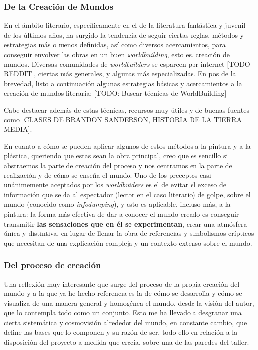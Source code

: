 \hypertarget{de-la-creaciuxf3n-de-mundos}{%
\subsubsection{De la Creación de
Mundos}\label{de-la-creaciuxf3n-de-mundos}}

En el ámbito literario, específicamente en el de la literatura
fantástica y juvenil de los últimos años, ha surgido la tendencia de
seguir ciertas reglas, métodos y estrategias más o menos definidas, así
como diversos acercamientos, para conseguir envolver las obras en un
buen \emph{worldbuilding}, esto es, creación de mundos. Diversas
comunidades de \emph{worldbuilders} se esparcen por internet {[}TODO
REDDIT{]}, ciertas más generales, y algunas más especializadas. En pos
de la brevedad, listo a continuación algunas estrategias básicas y
acercamientos a la creación de mundos literaria: {[}TODO: Buscar
técnicas de WorldBuilding{]}

Cabe destacar además de estas técnicas, recursos muy útiles y de buenas
fuentes como {[}CLASES DE BRANDON SANDERSON, HISTORIA DE LA TIERRA
MEDIA{]}.

En cuanto a cómo se pueden aplicar algunos de estos métodos a la pintura
y a la plástica, queriendo que estas sean la obra principal, creo que es
sencillo si abstraemos la parte de creación del proceso y nos centramos
en la parte de realización y de cómo se enseña el mundo. Uno de los
preceptos casi unánimemente aceptados por los \emph{worldbuiders} es el
de evitar el exceso de información que se da al espectador (lector en el
caso literario) de golpe, sobre el mundo (conocido como
\emph{infodumping}), y esto es aplicable, incluso más, a la pintura: la
forma más efectiva de dar a conocer el mundo creado es conseguir
transmitir \textbf{las sensaciones que en él se experimentan}, crear una
atmósfera única y distintiva, en lugar de llenar la obra de referencias
y simbolismos crípticos que necesitan de una explicación compleja y un
contexto extenso sobre el mundo.

\hypertarget{del-proceso-de-creaciuxf3n}{%
\subsubsection{Del proceso de
creación}\label{del-proceso-de-creaciuxf3n}}

Una reflexión muy interesante que surge del proceso de la propia
creación del mundo y a la que ya he hecho referencia es la de cómo se
desarrolla y cómo se visualiza de una manera general y homogénea el
mundo, desde la visión del autor, que lo contempla todo como un
conjunto. Esto me ha llevado a desgranar una cierta sistemática y
cosmovisión alrededor del mundo, en constante cambio, que define las
bases que lo componen y su razón de ser, todo ello en relación a la
disposición del proyecto a medida que crecía, sobre una de las paredes
del taller.

